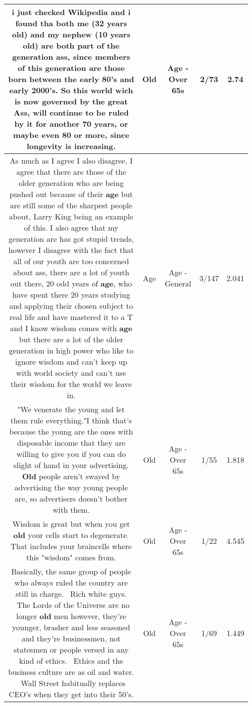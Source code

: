 \documentclass[11pt]{article}
\newlength\mylength
\begin{document}
\begin{center}
\begin{longtable}{|C{.65\mylength}|C{.30\mylength}|C{.12\mylength}|C{.12\mylength}|C{.12\mylength}|}
  \small i just checked Wikipedia and i found tha both me (32 years \textbf{old}) and my nephew (10 years \textbf{old}) are both part of the generation ass, since members of this generation are those born between the early 80's and early 2000's. So this world wich is now governed by the great Ass, will continue to be ruled by it for another 70 years, or maybe even 80 or more, since longevity is increasing.\normalsize   & Old & Age - Over 65s & 2/73 & 2.74 \\  \hline
  \small As much as I agree I also disagree, I agree that there are those of the older generation who are being pushed out because of their \textbf{age} but are still some of the sharpest people about, Larry King being an example of this. I also agree that my generation are has got stupid trends, however I disagree with the fact that all of our youth are too concerned about ass, there are a lot of youth out there, 20 odd years of \textbf{age}, who have spent there 20 years studying and applying their chosen subject to real life and have mastered it to a T and I know wisdom comes with \textbf{age} but there are a lot of the older generation in high power who like to ignore wisdom and can't keep up with world society and can't use their wisdom for the world we leave in.\normalsize   & Age & Age - General & 3/147 & 2.041 \\  \hline
  \small "We venerate the young and let them rule everything."I think that's because the young are the ones with disposable income that they are willing to give you if you can do slight of hand in your advertising. \textbf{Old} people aren't swayed by advertising the way young people are, so advertisers doesn't bother with them.\normalsize   & Old & Age - Over 65s & 1/55 & 1.818 \\  \hline
  \small Wisdom is great but when you get \textbf{old} your cells start to degenerate. That includes your braincells where this "wisdom" comes from.\normalsize   & Old & Age - Over 65s & 1/22 & 4.545 \\  \hline
  \small Basically, the same group of people who always ruled the country are still in charge.  Rich white guys.  The Lords of the Universe are no longer \textbf{old} men however, they're younger, brasher and less seasoned and they're businessmen, not statesmen or people versed in any kind of ethics.  Ethics and the business culture are as oil and water.  Wall Street habitually replaces CEO's when they get into their 50's.\normalsize   & Old & Age - Over 65s & 1/69 & 1.449 \\  \hline

\end{longtable}
\end{center}
\end{document}
